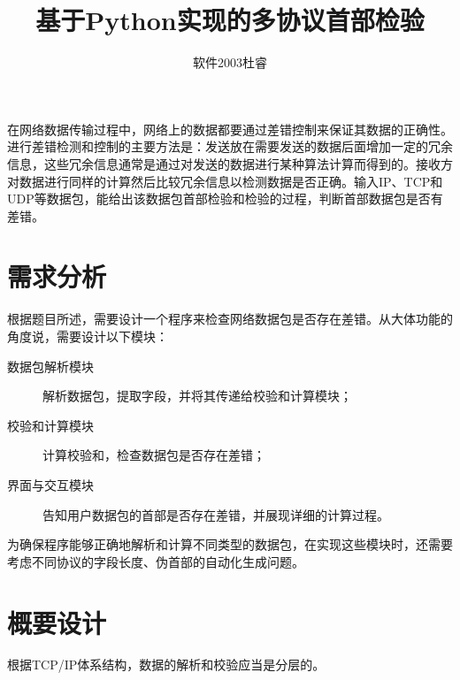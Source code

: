 \documentclass[a4paper,11pt]{article}
\begin{document}
\begin{spacing}{1.2}
\begin{CJK}{UTF8}{gbsn}
\title{基于Python实现的多协议首部检验}
\author{软件2003杜睿}
\date{}
\maketitle{}

在网络数据传输过程中，网络上的数据都要通过差错控制来保证其数据的正确性。进行差错检测和控制的主要方法是：发送放在需要发送的数据后面增加一定的冗余信息，这些冗余信息通常是通过对发送的数据进行某种算法计算而得到的。接收方对数据进行同样的计算然后比较冗余信息以检测数据是否正确。输入IP、TCP和UDP等数据包，能给出该数据包首部检验和检验的过程，判断首部数据包是否有差错。

\section{需求分析}

根据题目所述，需要设计一个程序来检查网络数据包是否存在差错。从大体功能的角度说，需要设计以下模块：

\begin{description}
	\item [数据包解析模块] 解析数据包，提取字段，并将其传递给校验和计算模块；
	\item [校验和计算模块] 计算校验和，检查数据包是否存在差错；
	\item [界面与交互模块] 告知用户数据包的首部是否存在差错，并展现详细的计算过程。
\end{description}


为确保程序能够正确地解析和计算不同类型的数据包，在实现这些模块时，还需要考虑不同协议的字段长度、伪首部的自动化生成问题。

\section{概要设计}

根据TCP/IP体系结构，数据的解析和校验应当是分层的。


\end{CJK}
\end{spacing}
\end{document}
